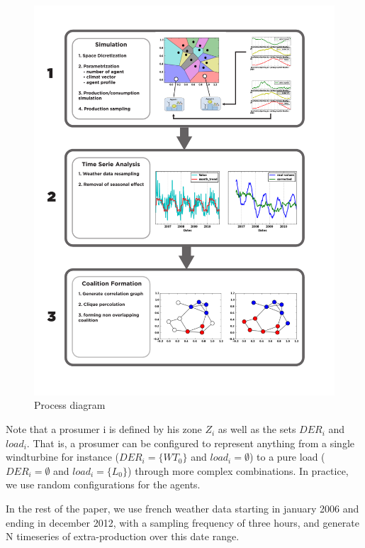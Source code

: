\documentclass[conference]{IEEEtran}
\begin{document}
\begin{figure}
\includegraphics[scale=.45]{Fig2}
\caption{Process diagram}
\label{fig:process}
\end{figure}

Note that a prosumer i is defined by his zone $ Z_{i} $ as well as the sets $ DER_{i} $ and $ load_{i} $. That is, a prosumer can be configured to represent anything from a single windturbine for instance ($ DER_{i} = \{ WT_{0} \} $ and $ load_{i} = \emptyset $) to a pure load ($ DER_{i} = \emptyset $ and $ load_{i} = \{ L_{0} \} $) through more complex combinations. In practice, we use random configurations for the agents.

In the rest of the paper, we use french weather data \cite{Infoclimat} starting in january 2006 and ending in december 2012, with a sampling frequency of three hours, and generate N timeseries of extra-production over this date range.



%
%
\end{document}
